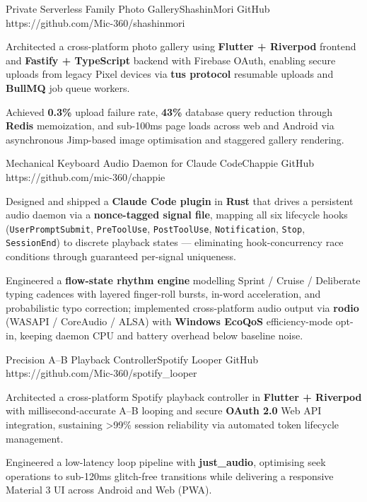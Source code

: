 \documentclass{bhaumic}
\begin{document}
\begin{samepage}
\projentry
  {Private Serverless Family Photo Gallery}{ShashinMori}
  {GitHub}
  {https://github.com/Mic-360/shashinmori}
  {
    \begin{resbullets}
      \item Architected a cross-platform photo gallery using \textbf{Flutter + Riverpod} frontend and \textbf{Fastify + TypeScript} backend with Firebase OAuth, enabling secure uploads from legacy Pixel devices via \textbf{tus protocol} resumable uploads and \textbf{BullMQ} job queue workers.
      \item Achieved \textbf{0.3\%} upload failure rate, \textbf{43\%} database query reduction through \textbf{Redis} memoization, and sub-100ms page loads across web and Android via asynchronous Jimp-based image optimisation and staggered gallery rendering.
    \end{resbullets}
  }
\end{samepage}

\begin{samepage}
\projentry
  {Mechanical Keyboard Audio Daemon for Claude Code}{Chappie}
  {GitHub}
  {https://github.com/mic-360/chappie}
  {
    \begin{resbullets}
      \item Designed and shipped a \textbf{Claude Code plugin} in \textbf{Rust} that drives a persistent audio daemon via a \textbf{nonce-tagged signal file}, mapping all six lifecycle hooks (\texttt{UserPromptSubmit}, \texttt{PreToolUse}, \texttt{PostToolUse}, \texttt{Notification}, \texttt{Stop}, \texttt{SessionEnd}) to discrete playback states — eliminating hook-concurrency race conditions through guaranteed per-signal uniqueness.
      \item Engineered a \textbf{flow-state rhythm engine} modelling Sprint / Cruise / Deliberate typing cadences with layered finger-roll bursts, in-word acceleration, and probabilistic typo correction; implemented cross-platform audio output via \textbf{rodio} (WASAPI / CoreAudio / ALSA) with \textbf{Windows EcoQoS} efficiency-mode opt-in, keeping daemon CPU and battery overhead below baseline noise.
    \end{resbullets}
  }
\end{samepage}

\begin{samepage}
\projentry
  {Precision A--B Playback Controller}{Spotify Looper}
  {GitHub}
  {https://github.com/Mic-360/spotify_looper}
  {
    \begin{resbullets}
      \item Architected a cross-platform Spotify playback controller in \textbf{Flutter + Riverpod} with millisecond-accurate A--B looping and secure \textbf{OAuth 2.0} Web API integration, sustaining \textgreater{}99\% session reliability via automated token lifecycle management.
      \item Engineered a low-latency loop pipeline with \textbf{just\_audio}, optimising seek operations to sub-120ms glitch-free transitions while delivering a responsive Material 3 UI across Android and Web (PWA).
    \end{resbullets}
  }
\end{samepage}
\end{document}
